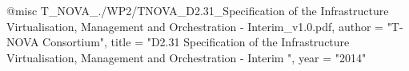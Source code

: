 @misc{ T_NOVA_./WP2/TNOVA_D2.31_Specification of the Infrastructure Virtualisation, Management and Orchestration - Interim_v1.0.pdf,
       author = "T-NOVA Consortium",
       title = "D2.31 Specification of the Infrastructure Virtualisation, Management and Orchestration - Interim ",
       year = "2014" }
